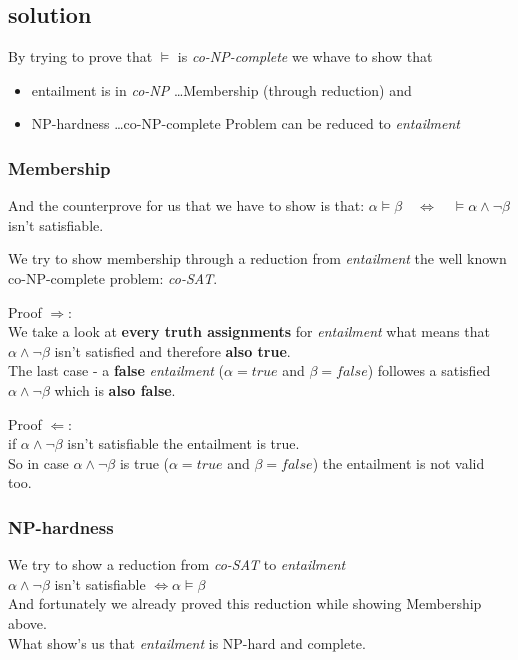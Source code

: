 \subsection{solution}

By trying to prove that $\vDash$ is \textit{co-NP-complete} we whave to show that
\begin{itemize}
 \item entailment is in \textit{co-NP} \dots Membership (through reduction) and
 \item NP-hardness \dots co-NP-complete Problem can be reduced to \textit{entailment}
\end{itemize}

\subsubsection{Membership}
And the counterprove for us that we have to show is that:
$\alpha \vDash \beta \quad\iff\quad \vDash\alpha \wedge \neg\beta$ isn't satisfiable.

\noindent We try to show membership through a reduction from \textit{entailment} the well known 
co-NP-complete problem: \textit{co-SAT}.\newline

\noindent Proof $\Rightarrow$:\\
We take a look at \textbf{every truth assignments} for \textit{entailment} what means 
that $\alpha \wedge \neg\beta$ isn't satisfied and therefore \textbf{also true}. \\
The last case - a \textbf{false} \textit{entailment} ($\alpha = true$ and $\beta = false$) 
followes a satisfied $\alpha \wedge \neg\beta$ which is \textbf{also false}.

\noindent Proof $\Leftarrow$:\\
if $\alpha \wedge \neg\beta$ isn't satisfiable the entailment is true.\\
So in case $\alpha \wedge \neg\beta$ is true ($\alpha = true$ and $\beta = false$)
the entailment is not valid too.

\subsubsection{NP-hardness}
We try to show a reduction from \textit{co-SAT} to \textit{entailment}\\

$\alpha \wedge \neg\beta$ isn't satisfiable $\iff \alpha \vDash \beta$\\
And fortunately we already proved this reduction while showing Membership above.\\

\noindent What show's us that \textit{entailment} is NP-hard and complete.